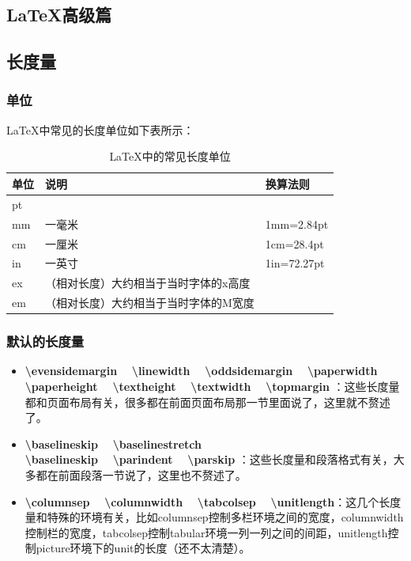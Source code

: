\documentclass[12pt,oneside]{book}
\begin{document}
\begin{common-format}
\chapter{\LaTeX 高级篇}

\section{长度量}

\subsection{单位}
\LaTeX{}中常见的长度单位如下表所示：
\begin{table}[H]
\centering
\label{tab:LaTeX中的常见长度单位}
\caption{\LaTeX{}中的常见长度单位}
\medskip 
\begin{tabular}{@{}lll@{}}
\toprule
单位 & 说明 & 换算法则 \\ \midrule
pt  &   &\\
mm  & 一毫米  & 1mm=2.84pt \\
cm  &  一厘米  &  1cm=28.4pt \\
in  &  一英寸 & 1in=72.27pt \\
ex  &  （相对长度）大约相当于当时字体的x高度 & \\
em  & （相对长度）大约相当于当时字体的M宽度 & \\ \bottomrule
\end{tabular}
\end{table}


\subsection{默认的长度量}
\begin{itemize}
\item \textbf{\textbackslash evensidemargin ~ \textbackslash linewidth ~ \textbackslash oddsidemargin ~ \textbackslash paperwidth ~  \textbackslash paperheight ~ \textbackslash textheight ~ \textbackslash textwidth ~ \textbackslash topmargin }：这些长度量都和页面布局有关，很多都在前面页面布局那一节里面说了，这里就不赘述了。
\item \textbf{\textbackslash baselineskip ~ \textbackslash baselinestretch ~\\ \textbackslash baselineskip ~  \textbackslash parindent  ~ \textbackslash parskip }：这些长度量和段落格式有关，大多都在前面段落一节说了，这里也不赘述了。
\item \textbf{\textbackslash columnsep ~ \textbackslash columnwidth ~ \textbackslash tabcolsep ~ \textbackslash unitlength}：这几个长度量和特殊的环境有关，比如columnsep控制多栏环境之间的宽度，columnwidth控制栏的宽度，tabcolsep控制tabular环境一列一列之间的间距，unitlength控制picture环境下的unit的长度（还不太清楚）。
\end{itemize}


\end{common-format}
\end{document}
